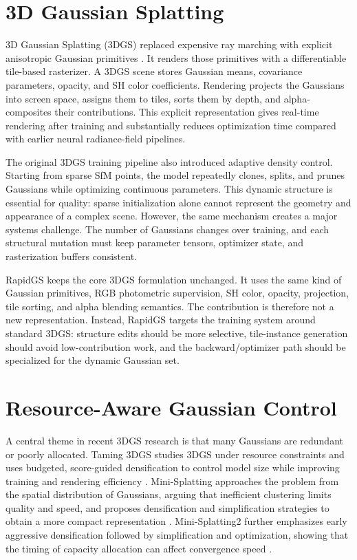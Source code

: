 \section{3D Gaussian Splatting}

3D Gaussian Splatting (3DGS) replaced expensive ray marching with explicit anisotropic Gaussian primitives \cite{KerblTOG2023GaussianSplatting}. It renders those primitives with a differentiable tile-based rasterizer. A 3DGS scene stores Gaussian means, covariance parameters, opacity, and SH color coefficients. Rendering projects the Gaussians into screen space, assigns them to tiles, sorts them by depth, and alpha-composites their contributions. This explicit representation gives real-time rendering after training and substantially reduces optimization time compared with earlier neural radiance-field pipelines.

The original 3DGS training pipeline also introduced adaptive density control. Starting from sparse SfM points, the model repeatedly clones, splits, and prunes Gaussians while optimizing continuous parameters. This dynamic structure is essential for quality: sparse initialization alone cannot represent the geometry and appearance of a complex scene. However, the same mechanism creates a major systems challenge. The number of Gaussians changes over training, and each structural mutation must keep parameter tensors, optimizer state, and rasterization buffers consistent.

RapidGS keeps the core 3DGS formulation unchanged. It uses the same kind of Gaussian primitives, RGB photometric supervision, SH color, opacity, projection, tile sorting, and alpha blending semantics. The contribution is therefore not a new representation. Instead, RapidGS targets the training system around standard 3DGS: structure edits should be more selective, tile-instance generation should avoid low-contribution work, and the backward/optimizer path should be specialized for the dynamic Gaussian set.

\section{Resource-Aware Gaussian Control}

A central theme in recent 3DGS research is that many Gaussians are redundant or poorly allocated. Taming 3DGS studies 3DGS under resource constraints and uses budgeted, score-guided densification to control model size while improving training and rendering efficiency \cite{MallickSIGGRAPHAsia2024Taming3DGS}. Mini-Splatting approaches the problem from the spatial distribution of Gaussians, arguing that inefficient clustering limits quality and speed, and proposes densification and simplification strategies to obtain a more compact representation \cite{Fang2024MiniSplatting}. Mini-Splatting2 further emphasizes early aggressive densification followed by simplification and optimization, showing that the timing of capacity allocation can affect convergence speed \cite{Fang2024MiniSplatting2}.

